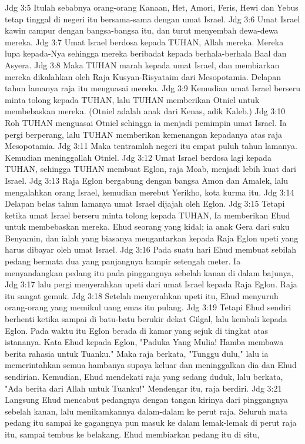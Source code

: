 Jdg 3:5  Itulah sebabnya orang-orang Kanaan, Het, Amori, Feris, Hewi dan Yebus tetap tinggal di negeri itu bersama-sama dengan umat Israel.
Jdg 3:6  Umat Israel kawin campur dengan bangsa-bangsa itu, dan turut menyembah dewa-dewa mereka.
Jdg 3:7  Umat Israel berdosa kepada TUHAN, Allah mereka. Mereka lupa kepada-Nya sehingga mereka beribadat kepada berhala-berhala Baal dan Asyera.
Jdg 3:8  Maka TUHAN marah kepada umat Israel, dan membiarkan mereka dikalahkan oleh Raja Kusyan-Risyataim dari Mesopotamia. Delapan tahun lamanya raja itu menguasai mereka.
Jdg 3:9  Kemudian umat Israel berseru minta tolong kepada TUHAN, lalu TUHAN memberikan Otniel untuk membebaskan mereka. (Otniel adalah anak dari Kenas, adik Kaleb.)
Jdg 3:10  Roh TUHAN menguasai Otniel sehingga ia menjadi pemimpin umat Israel. Ia pergi berperang, lalu TUHAN memberikan kemenangan kepadanya atas raja Mesopotamia.
Jdg 3:11  Maka tentramlah negeri itu empat puluh tahun lamanya. Kemudian meninggallah Otniel.
Jdg 3:12  Umat Israel berdosa lagi kepada TUHAN, sehingga TUHAN membuat Eglon, raja Moab, menjadi lebih kuat dari Israel.
Jdg 3:13  Raja Eglon bergabung dengan bangsa Amon dan Amalek, lalu mengalahkan orang Israel, kemudian merebut Yerikho, kota kurma itu.
Jdg 3:14  Delapan belas tahun lamanya umat Israel dijajah oleh Eglon.
Jdg 3:15  Tetapi ketika umat Israel berseru minta tolong kepada TUHAN, Ia memberikan Ehud untuk membebaskan mereka. Ehud seorang yang kidal; ia anak Gera dari suku Benyamin, dan ialah yang biasanya mengantarkan kepada Raja Eglon upeti yang harus dibayar oleh umat Israel.
Jdg 3:16  Pada suatu hari Ehud membuat sebilah pedang bermata dua yang panjangnya hampir setengah meter. Ia menyandangkan pedang itu pada pinggangnya sebelah kanan di dalam bajunya,
Jdg 3:17  lalu pergi menyerahkan upeti dari umat Israel kepada Raja Eglon. Raja itu sangat gemuk.
Jdg 3:18  Setelah menyerahkan upeti itu, Ehud menyuruh orang-orang yang memikul uang emas itu pulang.
Jdg 3:19  Tetapi Ehud sendiri berhenti ketika sampai di batu-batu berukir dekat Gilgal, lalu kembali kepada Eglon. Pada waktu itu Eglon berada di kamar yang sejuk di tingkat atas istananya. Kata Ehud kepada Eglon, "Paduka Yang Mulia! Hamba membawa berita rahasia untuk Tuanku." Maka raja berkata, "Tunggu dulu," lalu ia memerintahkan semua hambanya supaya keluar dan meninggalkan dia dan Ehud sendirian. Kemudian, Ehud mendekati raja yang sedang duduk, lalu berkata, "Ada berita dari Allah untuk Tuanku!" Mendengar itu, raja berdiri.
Jdg 3:21  Langsung Ehud mencabut pedangnya dengan tangan kirinya dari pinggangnya sebelah kanan, lalu menikamkannya dalam-dalam ke perut raja. Seluruh mata pedang itu sampai ke gagangnya pun masuk ke dalam lemak-lemak di perut raja itu, sampai tembus ke belakang. Ehud membiarkan pedang itu di situ,

